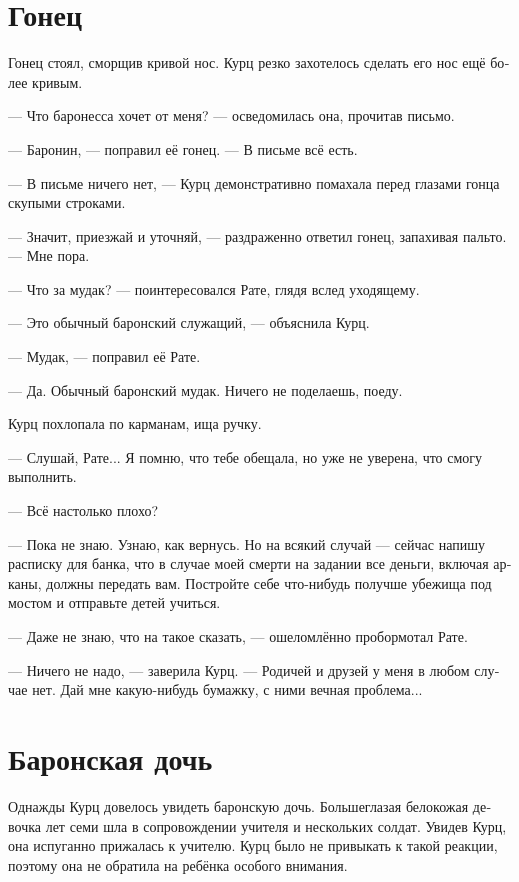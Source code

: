 \documentclass[a4paper,12pt,fleqn]{book}\usepackage{cooltooltips}\usepackage{polyglossia}\setdefaultlanguage[babelshorthands=true]{russian}\setotherlanguage{english}\defaultfontfeatures{Ligatures=TeX,Mapping=tex-text} \usepackage{xcolor}\definecolor{lightgray}{HTML}{bbbbbb}\color{lightgray}\newcommand{\ml}[3]{\textenglish{\textcolor{black}{#3}}}
\begin{document}
\section{Гонец}

Гонец стоял, сморщив кривой нос.
Курц резко захотелось сделать его нос ещё более кривым.

--- Что баронесса хочет от меня? --- осведомилась она, прочитав письмо.

--- Баронин, --- поправил её гонец.
--- В письме всё есть.

--- В письме ничего нет, --- Курц демонстративно помахала перед глазами гонца скупыми строками.

--- Значит, приезжай и уточняй, --- раздраженно ответил гонец, запахивая пальто.
--- Мне пора.

--- Что за мудак? --- поинтересовался Рате, глядя вслед уходящему.

--- Это обычный баронский служащий, --- объяснила Курц.

--- Мудак, --- поправил её Рате.

--- Да.
Обычный баронский мудак.
Ничего не поделаешь, поеду.

Курц похлопала по карманам, ища ручку.

--- Слушай, Рате...
Я помню, что тебе обещала, но уже не уверена, что смогу выполнить.

--- Всё настолько плохо?

--- Пока не знаю.
Узнаю, как вернусь.
Но на всякий случай --- сейчас напишу расписку для банка, что в случае моей смерти на задании все деньги, включая арканы, должны передать вам.
Постройте себе что-нибудь получше убежища под мостом и отправьте детей учиться.

--- Даже не знаю, что на такое сказать, --- ошеломлённо пробормотал Рате.

--- Ничего не надо, --- заверила Курц.
--- Родичей и друзей у меня в любом случае нет.
Дай мне какую-нибудь бумажку, с ними вечная проблема...

\section{Баронская дочь}

Однажды Курц довелось увидеть баронскую дочь.
Большеглазая белокожая девочка лет семи шла в сопровождении учителя и нескольких солдат.
Увидев Курц, она испуганно прижалась к учителю.
Курц было не привыкать к такой реакции, поэтому она не обратила на ребёнка особого внимания.
\end{document}
